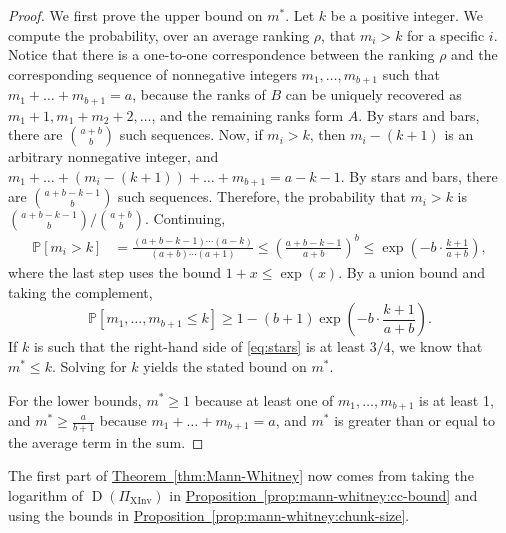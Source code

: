 \documentclass[11pt]{article}
\numberwithin{equation}{section}
\theoremstyle{definition}
\theoremstyle{plain}
\newcommand{\expref}[2]{\hyperref[#2]{#1~\ref{#2}}}
\renewcommand{\Pr}{\mathbb{P}}
\newcommand{\ranking}{\rho}
\DeclareMathOperator{\XInv}{XInv}
\DeclareMathOperator{\traces}{D}
\begin{document}
\begin{proof}
We first prove the upper bound on $m^*$. Let $k$ be a positive integer. We compute the probability, over an average ranking $\ranking$, that $m_i> k$ for a specific $i$. 
Notice that there is a one-to-one correspondence between the ranking $\ranking$ and the corresponding sequence of nonnegative integers $m_1,\dots,m_{b+1}$ such that $m_1+\dots+m_{b+1}=a$, because the ranks of $B$ can be uniquely recovered as $m_1+1,m_1+m_2+2,\dots$, and the remaining ranks form $A$. By stars and bars, there are $\binom{a+b}{b}$ such sequences. Now, if $m_i>k$, then $m_i-(k+1)$ is an arbitrary nonnegative integer, and $m_1+\dots+(m_i-(k+1))+\dots+m_{b+1}=a-k-1$. By stars and bars, there are $\binom{a+b-k-1}{b}$ such sequences. Therefore, the probability that $m_i>k$ is $\binom{a+b-k-1}{b}/\binom{a+b}{b}$. Continuing,
\begin{align*}
\Pr[m_i> k]&=\frac{(a+b-k-1)\cdots (a-k)}{(a+b)\cdots (a+1)}
        \le \left(\frac{a+b-k-1}{a+b}\right)^b
        \le \exp\left(-b\cdot \frac{k+1}{a+b} \right),
\end{align*}
where the last step uses the bound $1+x \le \exp(x)$.
By a union bound and taking the complement,
    \begin{equation}\label{eq:stars}
        \Pr[m_1,\dots,m_{b+1}\le k] \ge 1-(b+1)\exp\left(-b\cdot \frac{k+1}{a+b} \right).
    \end{equation}
If $k$ is such that the right-hand side of \eqref{eq:stars} is at least $3/4$, we know that $m^* \le k$. Solving for $k$ yields the stated bound on $m^*$.
    
For the lower bounds, $m^*\ge 1$ because at least one of $m_1,\dots,m_{b+1}$ is at least 1, and $m^*\ge \frac{a}{b+1}$ because $m_1+\dots+m_{b+1}=a$, and $m^*$ is greater than or equal to the average term in the sum.
\end{proof}

The first part of \expref{Theorem}{thm:Mann-Whitney} now comes from taking the logarithm of $\traces(\Pi_{\XInv})$ in \expref{Proposition}{prop:mann-whitney:cc-bound} and using the bounds in \expref{Proposition}{prop:mann-whitney:chunk-size}.
\end{document}
